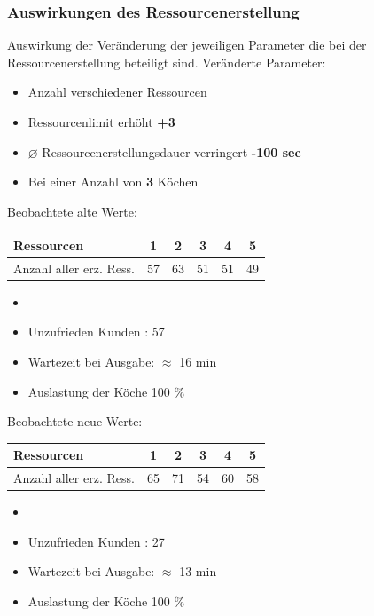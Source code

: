 \documentclass{beamer}
\begin{document}
\begin{frame} %
  \frametitle{ Auswirkungen des Ressourcenerstellung} 
  Auswirkung der Veränderung der jeweiligen Parameter
  die bei der Ressourcenerstellung beteiligt sind.\newline
  Veränderte Parameter:
  \begin{itemize}
  	\item Anzahl verschiedener Ressourcen
  	\item Ressourcenlimit erhöht \textbf{+3}
  	\item $\diameter$ Ressourcenerstellungsdauer verringert \textbf{-100 sec}
  	\item Bei einer Anzahl von \textbf{3} Köchen
  \end{itemize}

 

\end{frame} 

\begin{frame}
	Beobachtete alte Werte: \newline 

	\begin{tabular}{|l|c|c|c|c|c|}\hline 
     Ressourcen	&1&2&3&4&5\\ \hline \hline
  	 	Anzahl aller erz. Ress.&57&63&51&51&49\\ \hline
	\end{tabular}%
	
	
	
	\begin{itemize}
	\item[]
	\item Unzufrieden Kunden : 57
	\item Wartezeit bei Ausgabe: $\approx$ 16 min
	\item Auslastung der Köche 100 \%
	\end{itemize}


	 Beobachtete neue Werte: \newline
	
	\begin{tabular}{|l|c|c|c|c|c|}\hline 
     	Ressourcen	&1&2&3&4&5\\ \hline \hline
  	 	Anzahl aller erz. Ress.&65&71&54&60&58\\ \hline
	\end{tabular}
	
	\begin{itemize}
		\item[]
		\item Unzufrieden Kunden : 27
		\item Wartezeit bei Ausgabe: $\approx$ 13 min
		\item Auslastung der Köche 100 \%
	\end{itemize}
	
\end{frame} 
\end{document}

